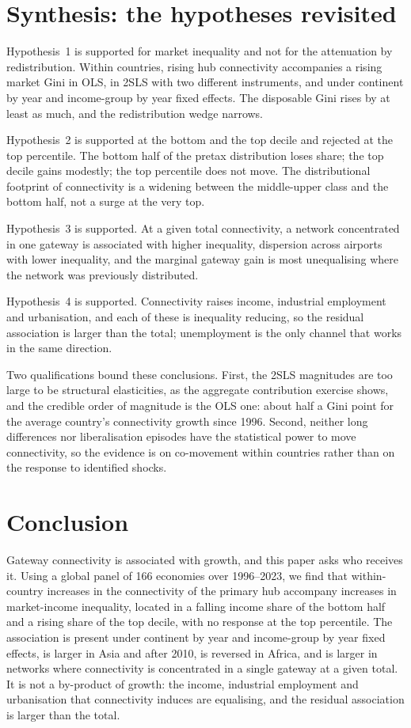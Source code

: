 \documentclass[12pt]{article}
\begin{document}
\section{Synthesis: the hypotheses revisited}
\label{sec:synthesis}
Hypothesis~1 is supported for market inequality and not for the attenuation by redistribution. Within countries, rising hub connectivity accompanies a rising market Gini in OLS, in 2SLS with two different instruments, and under continent by year and income-group by year fixed effects. The disposable Gini rises by at least as much, and the redistribution wedge narrows.

Hypothesis~2 is supported at the bottom and the top decile and rejected at the top percentile. The bottom half of the pretax distribution loses share; the top decile gains modestly; the top percentile does not move. The distributional footprint of connectivity is a widening between the middle-upper class and the bottom half, not a surge at the very top.

Hypothesis~3 is supported. At a given total connectivity, a network concentrated in one gateway is associated with higher inequality, dispersion across airports with lower inequality, and the marginal gateway gain is most unequalising where the network was previously distributed.

Hypothesis~4 is supported. Connectivity raises income, industrial employment and urbanisation, and each of these is inequality reducing, so the residual association is larger than the total; unemployment is the only channel that works in the same direction.

Two qualifications bound these conclusions. First, the 2SLS magnitudes are too large to be structural elasticities, as the aggregate contribution exercise shows, and the credible order of magnitude is the OLS one: about half a Gini point for the average country's connectivity growth since 1996. Second, neither long differences nor liberalisation episodes have the statistical power to move connectivity, so the evidence is on co-movement within countries rather than on the response to identified shocks.

\section{Conclusion}
\label{sec:conclusion}
Gateway connectivity is associated with growth, and this paper asks who receives it. Using a global panel of 166 economies over 1996--2023, we find that within-country increases in the connectivity of the primary hub accompany increases in market-income inequality, located in a falling income share of the bottom half and a rising share of the top decile, with no response at the top percentile. The association is present under continent by year and income-group by year fixed effects, is larger in Asia and after 2010, is reversed in Africa, and is larger in networks where connectivity is concentrated in a single gateway at a given total. It is not a by-product of growth: the income, industrial employment and urbanisation that connectivity induces are equalising, and the residual association is larger than the total.
\end{document}
